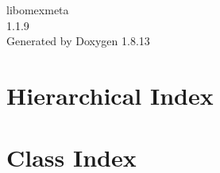 \documentclass[twoside]{book}
\newcommand{\+}{\discretionary{\mbox{\scriptsize$\hookleftarrow$}}{}{}}
\newcommand{\clearemptydoublepage}{%
  \newpage{\pagestyle{empty}\cleardoublepage}%
}
\begin{document}
\hypersetup{pageanchor=false,
             bookmarksnumbered=true,
             pdfencoding=unicode
            }
\begin{titlepage}
\vspace*{7cm}
\begin{center}%
{\Large libomexmeta \\[1ex]\large 1.\+1.\+9 }\\
\vspace*{1cm}
{\large Generated by Doxygen 1.8.13}\\
\end{center}
\end{titlepage}
\clearemptydoublepage
{}
\tableofcontents
\clearemptydoublepage
{}
\hypersetup{pageanchor=true}

\chapter{Hierarchical Index}

\chapter{Class Index}

\end{document}
